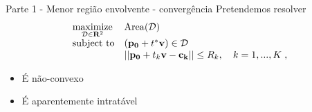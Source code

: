 \documentclass{beamer}					%
\begin{document}
\begin{frame}{Parte 1  - Menor região envolvente - convergência}
Pretendemos resolver 
	\begin{equation} \label{eq:noncvx}
	\begin{array}[t]{ll} 
	\underset{\mathcal{D} \in \mathbf{R}^2}{\text{maximize}} & \mathrm{Area}(\mathcal{D})\\
	\text{subject to} &\left (\mathbf{p_0} + t^*\mathbf{v}\right) \in \mathcal{D}\\
	& \left | \left| \mathbf{p_0} + t_k \mathbf{v}-\mathbf{c_k}\right|\right| \leq R_k, \quad k=1,...,K\;,
	\end{array}
	\end{equation}
	
\begin{itemize}
	\item É não-convexo
	\item É aparentemente intratável\\
\end{itemize}
\end{frame}
\end{document}
